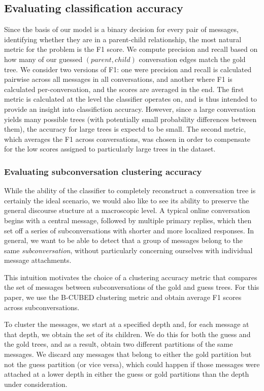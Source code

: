\documentclass{article}
\begin{document}
\subsection{Evaluating classification accuracy}
\label{sec:evaluation}
Since the basis of our model is a binary decision for every pair of messages,
identifying whether they are in a parent-child relationship, the most natural
metric for the problem is the F1 score. We compute precision and recall based
on how many of our guessed $(parent,child)$ conversation edges match the gold
tree. We consider two versions of F1: one were precision and recall is
calculated pairwise across all messages in all conversations, and another
where F1 is calculated per-conversation, and the scores are averaged in the
end. The first metric is calculated at the level the classifier operates on,
and is thus intended to provide an insight into classifiction accuracy.
However, since a large conversation yields many possible trees (with
potentially small probability differences between them), the accuracy for
large trees is expectd to be small. The second metric, which averages the F1
across conversations, was chosen in order to compensate for the low scores
assigned to particularly large trees in the dataset.

\subsubsection{Evaluating subconversation clustering accuracy}
While the ability of the classifier to completely reconstruct a conversation
tree is certainly the ideal scenario, we would also like to see its ability to
preserve the general discourse stucture at a macroscopic level. A typical
online conversation begins with a central message, followed by multiple
primary replies, which then set off a series of subconversations with shorter
and more localized responses. In general, we want to be able to detect that a
group of messages belong to the same \emph{subconversation}, without
particularly concerning ourselves with individual message attachments.

This intuition motivates the choice of a clustering accuracy metric that
compares the set of messages between subconversations of the gold and guess
trees. For this paper, we use the B-CUBED clustering metric \cite{Bagga98} and
obtain average F1 scores across subconversations.

To cluster the messages, we start at a specified depth and, for each message
at that depth, we obtain the set of its children. We do this for both the
guess and the gold trees, and as a result, obtain two different partitions of
the same messages. We discard any messages that belong to either the gold
partition but not the guess partition (or vice versa), which could happen if
those messages were attached at a lower depth in either the guess or gold
partitions than the depth under consideration.
\end{document}
